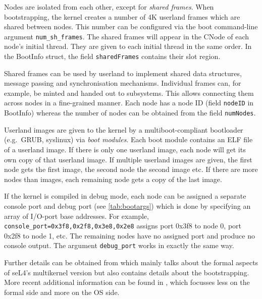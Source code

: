 Nodes are isolated from each other, except for
\emph{shared frames}. When bootstrapping, the kernel creates a number of 4K
userland frames which are shared between nodes. This number can be configured
via the boot command-line argument \texttt{num\_sh\_frames}. The shared frames
will appear in the CNode of each node's initial thread. They are given to
each initial thread in the same order. In the BootInfo struct, the field
\texttt{sharedFrames} contains their slot region.

Shared frames can be used by userland to implement
shared data structures,
message passing and synchronisation mechanisms. Individual frames can, for
example, be minted and handed out to subsystems. This allows connecting them
across nodes in a fine-grained manner. Each node has a node ID (field
\texttt{nodeID} in BootInfo) whereas the number of nodes can be obtained from
the field \texttt{numNodes}.

Userland images are given to the kernel by a multiboot-compliant bootloader
(e.g.\ GRUB, syslinux) via \emph{boot modules}. Each boot module contains an
ELF file of a userland image. If there is only one userland image,
each node will get its own copy of that userland image. If
multiple userland images are given, the first node gets the first image, the
second node the second image etc. If there are more nodes than images, each
remaining node gets a copy of the last image.

If the kernel is compiled in debug mode, each node can be assigned a separate
console port and debug port (see \autoref{tab:bootargs}) which is done by
specifying an array of I/O-port base addresses. For example,
\texttt{console\_port=0x3f8,0x2f8,0x3e8,0x2e8}
assigns port 0x3f8 to node 0, port 0x2f8 to node 1, etc. The remaining nodes
have no assigned port and produce no console output. The argument
\texttt{debug\_port} works in exactly the same way.

Further details can be obtained from \cite{vonTessin_10} which mainly talks
about the formal aspects of seL4's multikernel version but also contains
details about the bootstrapping. More recent additional information can be
found in \cite{vonTessin_12}, which focusses less on the formal side
and more on the OS side.
\fi
